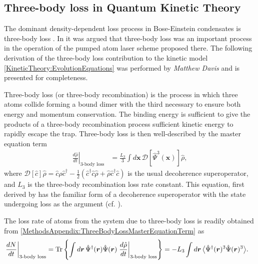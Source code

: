 \subsection{Three-body loss in Quantum Kinetic Theory}
\label{MethodsAppendix:QKT3BodyLoss}

The dominant density-dependent loss process in Bose-Einstein condensates is three-body loss \citep{Burt:1997fk,Soding:1999}. In  it was argued that three-body loss was an important process in the operation of the pumped atom laser scheme proposed there.  The following derivation of the three-body loss contribution to the kinetic model \eqref{KineticTheory:EvolutionEquations} was performed by \emph{Matthew Davis} and is presented for completeness.

Three-body loss (or three-body recombination) is the process in which three atoms collide forming a bound dimer with the third necessary to ensure both energy and momentum conservation.  The binding energy is sufficient to give the products of a three-body recombination process sufficient kinetic energy to rapidly escape the trap.  Three-body loss is then well-described by the master equation term
\begin{align}
    \left. \frac{d \hat{\rho}}{d t}\right|_\text{3-body loss} &= \frac{L_3}{3} \int d \bm{x} \,\mathcal{D} \left[ \hat{\Psi}^3(\bm{x}) \right] \hat{\rho},
    \label{MethodsAppendix:ThreeBodyLossMasterEquationTerm}
\end{align}
where $\mathcal{D}[\hat{c}]\hat{\rho} = \hat{c}\hat{\rho} \hat{c}^\dagger - \frac{1}{2}(\hat{c}^\dagger \hat{c}\hat{\rho} + \hat{\rho} \hat{c}^\dagger \hat{c})$ is the usual decoherence superoperator, and $L_3$ is the three-body recombination loss rate constant.  This equation, first derived by \citep{Jack:2002} has the familiar form of a decoherence superoperator with the state undergoing loss as the argument (cf. ). %

The loss rate of atoms from the system due to three-body loss is readily obtained from \eqref{MethodsAppendix:ThreeBodyLossMasterEquationTerm} as
\begin{align}
    \left.\frac{d N}{dt} \right|_\text{3-body loss} &=  \Tr\left\{\int d \bm{r}\,\hat{\Psi}^\dagger(\bm{r})\hat{\Psi}(\bm{r}) \left.\frac{d \hat{\rho}}{dt}\right|_\text{3-body loss} \right\} = - L_3 \int d \bm{r}\, \mean{\hat{\Psi}^\dagger(\bm{r})^3 \hat{\Psi}(\bm{r})^3}.
    \label{MethodsAppendix:ThreeBodyLossNumberLossRate}
\end{align}

